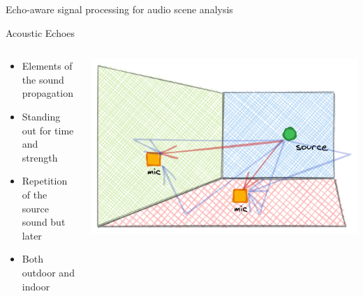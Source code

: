 \begin{frame}[t]{\alert{Echo-aware signal processing for audio scene analysis}}

    \begin{mydefblock}{Acoustic Echoes}

        \vspace{-3mm}
        \begin{columns}[onlytextwidth]
            \begin{column}{0.60\textwidth}
                \begin{itemize}
                    \item Elements of the sound propagation
                    \item Standing out for time and strength
                    \item Repetition of the source sound but later
                    \item Both outdoor and indoor
                \end{itemize}
            \end{column}
            \begin{column}{0.38\textwidth}
                \centering
                \includegraphics[width=\textwidth]{figures/echoes}
            \end{column}

        \end{columns}
    \end{mydefblock}


\end{frame}
